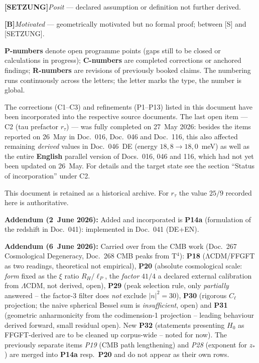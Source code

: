\smallskip\noindent \textbf{[SETZUNG]}\quad \emph{Posit} — declared assumption or definition not further derived.

\smallskip\noindent \textbf{[B]}\quad \emph{Motivated} — geometrically motivated but no formal proof; between [S] and [SETZUNG].

\medskip


\smallskip
\noindent\textbf{P-numbers} denote open programme points (gaps still to be
closed or calculations in progress); \textbf{C-numbers} are completed
corrections or anchored findings; \textbf{R-numbers} are revisions of
previously booked claims. The numbering runs continuously across the
letters; the letter marks the type, the number is global.

The corrections (C1--C3) and refinements (P1--P13) listed in this document
have been incorporated into the respective source documents. The last open
item --- C2 (tau prefactor $r_\tau$) --- was fully completed on 27~May 2026:
besides the items reported on 26~May in Doc.~016, Doc.~046 and Doc.~116, this
also affected remaining \emph{derived} values in Doc.~046~DE (energy
$18{,}8 \to 18{,}0$~meV) as well as the entire \textbf{English} parallel
version of Docs.~016, 046 and 116, which had not yet been updated on 26~May.
For details and the target state see the section ``Status of incorporation''
under C2.

This document is retained as a historical archive. For $r_\tau$ the value
$25/9$ recorded here is authoritative.

\medskip

\textbf{Addendum (2~June 2026):} Added and incorporated is \textbf{P14a}
(formulation of the redshift in Doc.~041): implemented in Doc.~041 (DE+EN).

\medskip

\textbf{Addendum (6~June 2026):} Carried over from the CMB work (Doc.~267
Cosmological Degeneracy, Doc.~268 CMB peaks from T$^4$): \textbf{P18}
(ΛCDM/FFGFT as two readings, theoretical not empirical),
\textbf{P20} (absolute cosmological scale: \emph{form} fixed as the $\xi$ ratio $R_H/\ell_P$, the \emph{factor} $41/4$ a declared external calibration from $\Lambda$CDM, not derived, open), \textbf{P29} (peak selection rule,
only \emph{partially} answered -- the factor-3 filter does \emph{not} exclude
$|n|^2=30$), \textbf{P30} (rigorous $C_\ell$ projection; the naive spherical
Bessel sum is \emph{insufficient}, open) and \textbf{P31} (geometric
anharmonicity from the codimension-1 projection -- leading behaviour derived
forward, small residual open). New \textbf{P32} (statements presenting $H_0$ as
FFGFT-derived are to be cleaned up corpus-wide -- noted for now). The
previously separate items \emph{P19} (CMB path lengthening) and \emph{P28}
(exponent for $z_*$) are merged into \textbf{P14a} resp.\ \textbf{P20} and do
not appear as their own rows.

